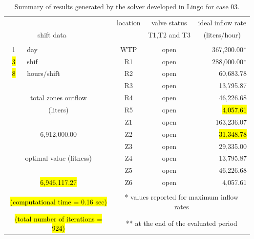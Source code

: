 \documentclass{singlecol}
\theoremstyle{TH}{
\newtheorem{lemma}{Lemma}
\newtheorem{theorem}[lemma]{Theorem}
\newtheorem{corrolary}[lemma]{Corrolary}
\newtheorem{conjecture}[lemma]{Conjecture}
\newtheorem{proposition}[lemma]{Proposition}
\newtheorem{claim}[lemma]{Claim}
\newtheorem{stheorem}[lemma]{Wrong Theorem}
\newtheorem{algorithm}{Algorithm}
}
\theoremstyle{THrm}{
\newtheorem{definition}{Definition}[section]
\newtheorem{question}{Question}[section]
\newtheorem{remark}{Remark}
\newtheorem{scheme}{Scheme}
}
\theoremstyle{THhit}{
\newtheorem{case}{Case}[section]
}
\begin{document}
\begin{table}[t]
\begin{center}
\begin{small}
\begin{tabular}{ c r r r r r }
		   \\
		&  &      &  \multicolumn{1}{c}{location}    & \multicolumn{1}{c}{valve status} & \multicolumn{1}{c}{ideal inflow rate}   \\
		\multicolumn{2}{c}{shift data}     &   &      & \multicolumn{1}{c}{T1,T2 and T3} & \multicolumn{1}{c}{(liters/hour)} \\
		   \\
		1   &  \multicolumn{1}{l}{day}   &              	& \multicolumn{1}{c}{WTP} & \multicolumn{1}{c}{open} &  367,200.00* \\
		\hl{3}   &  \multicolumn{1}{l}{shif}  &         			& \multicolumn{1}{c}{R1}  & \multicolumn{1}{c}{open} &  288,000.00* \\
		\hl{8}  &  \multicolumn{1}{l}{hours/shift}        &     & \multicolumn{1}{c}{R2}  & \multicolumn{1}{c}{open} &   60,683.78  \\
	   &      &              								& \multicolumn{1}{c}{R3}  & \multicolumn{1}{c}{open} &   13,795.87  \\
	   \multicolumn{3}{c}{total zones outflow}              & \multicolumn{1}{c}{R4}  & \multicolumn{1}{c}{open} &   46,226.68  \\
	   \multicolumn{3}{c}{(liters)}              		    & \multicolumn{1}{c}{R5}  & \multicolumn{1}{c}{open} &    \hl{4,057.61}  \\
	   &      &              								& \multicolumn{1}{c}{Z1}  & \multicolumn{1}{c}{open} &  163,236.07  \\
	   \multicolumn{3}{c}{6,912,000.00}              		& \multicolumn{1}{c}{Z2}  & \multicolumn{1}{c}{open} &   \hl{31,348.78}  \\
	      &              &              					& \multicolumn{1}{c}{Z3}  & \multicolumn{1}{c}{open} &   29,335.00  \\
	   \multicolumn{3}{c}{optimal value (fitness)}          & \multicolumn{1}{c}{Z4}  & \multicolumn{1}{c}{open} &   13,795.87  \\
	   &             &             						 	& \multicolumn{1}{c}{Z5}  & \multicolumn{1}{c}{open} &   46,226.68  \\
	   \multicolumn{3}{c}{\hl{6,946,117.27}}                     & \multicolumn{1}{c}{Z6}  & \multicolumn{1}{c}{open} &    4,057.61 \\
	   \\
	   \multicolumn{3}{c}{\hl{(computational time  = 0.16 sec)}}     & \multicolumn{3}{c}{* values reported for maximum inflow rates} \\
	   \multicolumn{3}{c}{\hl{(total number of iterations = 924)}}   & \multicolumn{3}{c}{** at the end of the evaluated period} 
	\end{tabular}
		\end{small}
\caption{Summary of results generated by the solver developed in Lingo for case 03.}
\label{tab:lingoEvalCase03}
\end{center}
\end{table}
\end{document}
